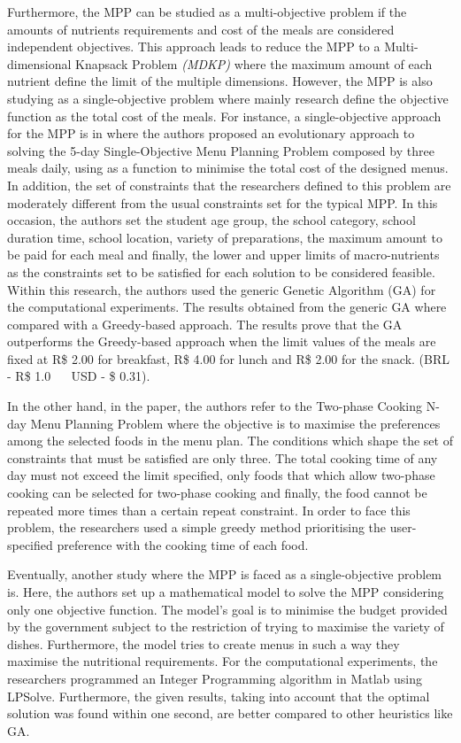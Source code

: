 Furthermore, the MPP can be studied as a multi-objective problem\cite{Seljak2009} if the amounts of nutrients requirements and cost of the meals are considered independent objectives. This approach leads to reduce the MPP to a Multi-dimensional Knapsack Problem \textit{(MDKP)} where the maximum amount of each nutrient define the limit of the multiple dimensions. However, the MPP is also studying as a single-objective problem where mainly research define the objective function as the total cost of the meals. For instance, a single-objective approach for the MPP is in\cite{Moreira2018} where the authors proposed an evolutionary approach to solving the 5-day Single-Objective Menu Planning Problem composed by three meals daily, using as a function to minimise the total cost of the designed menus. In addition, the set of constraints that the researchers defined to this problem are moderately different from the usual constraints set for the typical MPP. In this occasion, the authors set the student age group, the school category, school duration time, school location, variety of preparations, the maximum amount to be paid for each meal and finally, the lower and upper limits of macro-nutrients as the constraints set to be satisfied for each solution to be considered feasible. Within this research, the authors used the generic Genetic Algorithm (GA) for the computational experiments. The results obtained from the generic GA where compared with a Greedy-based approach. The results prove that the GA outperforms the Greedy-based approach when the limit values of the meals are fixed at R\$ 2.00 for breakfast, R\$ 4.00 for lunch and R\$ 2.00 for the snack. (BRL - R\$ 1.0 ~~ USD - \$ 0.31).

In the other hand, in the paper\cite{Funabiki2011}, the authors refer to the Two-phase Cooking N-day Menu Planning Problem where the objective is to maximise the preferences among the selected foods in the menu plan. The conditions which shape the set of constraints that must be satisfied are only three. The total cooking time of any day must not exceed the limit specified, only foods that which allow two-phase cooking can be selected for two-phase cooking and finally, the food cannot be repeated more times than a certain repeat constraint. In order to face this problem, the researchers used a simple greedy method prioritising the user-specified preference with the cooking time of each food.

Eventually, another study where the MPP is faced as a single-objective problem is\cite{Sufahani2014}. Here, the authors set up a mathematical model to solve the MPP considering only one objective function. The model's goal is to minimise the budget provided by the government subject to the restriction of trying to maximise the variety of dishes. Furthermore, the model tries to create menus in such a way they maximise the nutritional requirements. For the computational experiments, the researchers programmed an Integer Programming algorithm in Matlab using LPSolve. Furthermore, the given results, taking into account that the optimal solution was found within one second, are better compared to other heuristics like GA.

